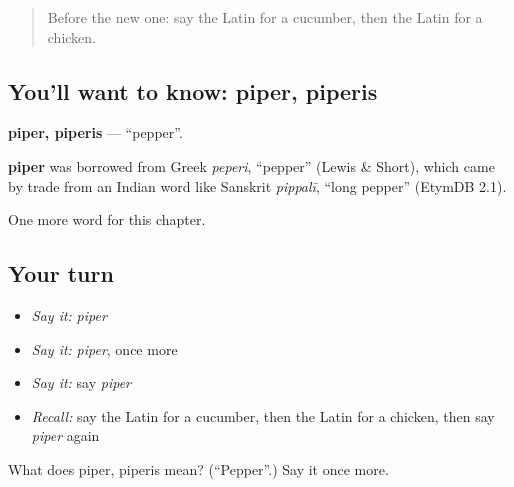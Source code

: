 \label{lesson:LA-C127-piper}



\begin{quote}
Before the new one: say the Latin for a cucumber, then the Latin for a chicken.
\end{quote}

\subsection*{You'll want to know: piper, piperis}
\textbf{piper, piperis} — \textquotedblleft{}pepper\textquotedblright{}.

\begin{cousinweb}
\textbf{piper} was borrowed from Greek \emph{peperi}, \textquotedblleft{}pepper\textquotedblright{} (Lewis \& Short), which came by trade from an Indian word like Sanskrit \emph{pippalī}, \textquotedblleft{}long pepper\textquotedblright{} (EtymDB 2.1).
\end{cousinweb}

\begin{grammarlens}[title={What you've built}]
One more word for this chapter.
\end{grammarlens}

\subsection*{Your turn}
\begin{itemize}
\raggedright
  \item \emph{Say it:} \emph{piper}
  \item \emph{Say it:} \emph{piper}, once more
  \item \emph{Say it:} say \emph{piper}
  \item \emph{Recall:} say the Latin for a cucumber, then the Latin for a chicken, then say \emph{piper} again
\end{itemize}

\begin{tcolorbox}[breakable,colback=teal!4,colframe=teal!35!black,title={Before you move on}]
What does piper, piperis mean? (\textquotedblleft{}Pepper\textquotedblright{}.) Say it once more.
\end{tcolorbox}
